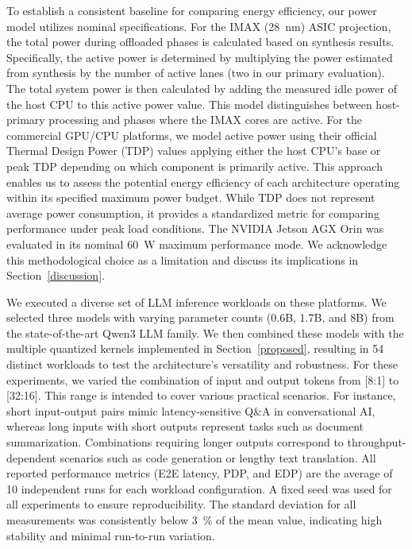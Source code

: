 To establish a consistent baseline for comparing energy efficiency, our power model utilizes nominal specifications.
For the IMAX (\SI{28}{\nano\meter}) ASIC projection, the total power during offloaded phases is calculated based on synthesis results. 
Specifically, the active power is determined by multiplying the power estimated from synthesis by the number of active lanes (two in our primary evaluation). 
The total system power is then calculated by adding the measured idle power of the host CPU to this active power value. 
This model distinguishes between host-primary processing and phases where the IMAX cores are active.
For the commercial GPU/CPU platforms, we model active power using their official Thermal Design Power (TDP) values applying either the host CPU's base or peak TDP\cite{Intel_Xeon_w5-2455X_Specs} depending on which component is primarily active. 
This approach enables us to assess the potential energy efficiency of each architecture operating within its specified maximum power budget.
While TDP does not represent average power consumption, it provides a standardized metric for comparing performance under peak load conditions. 
The NVIDIA Jetson AGX Orin was evaluated in its nominal \SI{60}{\watt} maximum performance mode. 
We acknowledge this methodological choice as a limitation and discuss its implications in Section~\ref{discussion}.

We executed a diverse set of LLM inference workloads on these platforms.
We selected three models with varying parameter counts (0.6B, 1.7B, and 8B) from the state-of-the-art Qwen3 LLM family. 
We then combined these models with the multiple quantized kernels implemented in Section~\ref{proposed}, resulting in 54 distinct workloads to test the architecture's versatility and robustness. 
For these experiments, we varied the combination of input and output tokens from [8:1] to [32:16]. 
This range is intended to cover various practical scenarios. 
For instance, short input-output pairs mimic latency-sensitive Q\&A in conversational AI, whereas long inputs with short outputs represent tasks such as document summarization.
Combinations requiring longer outputs correspond to throughput-dependent scenarios such as code generation or lengthy text translation.
All reported performance metrics (E2E latency, PDP, and EDP) are the average of 10 independent runs for each workload configuration.
A fixed seed was used for all experiments to ensure reproducibility.
The standard deviation for all measurements was consistently below \SI{3}{\percent} of the mean value, indicating high stability and minimal run-to-run variation. 




